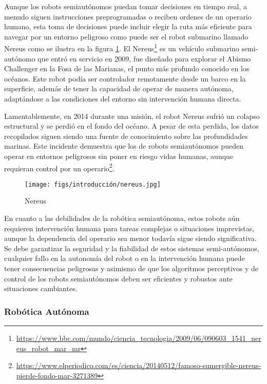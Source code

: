 Aunque los robots semiautónomos puedan tomar decisiones en tiempo real, a menudo siguen instrucciones preprogramadas o reciben ordenes de un operario humano, esta toma de decisiones
puede incluir elegir la ruta más eficiente para navegar por un entorno peligroso como puede ser el robot submarino llamado Nereus como se ilustra en la figura \ref{fig:Nereus}. 
El Nereus\footnote{\url{https://www.bbc.com/mundo/ciencia_tecnologia/2009/06/090603_1541_nereus_robot_mar_mr}} 
es un vehículo submarino semi-autónomo que entró en servicio en 2009, fue diseñado para explorar el Abismo Challenger en la Fosa de las Marianas, el punto más profundo conocido en los 
océanos. Este robot podía ser controlador remotamente desde un barco en la superficie, además de tener la capacidad de operar de manera autónoma, adaptándose a las condiciones del entorno
sin intervención humana directa.

Lamentablemente, en 2014 durante una misión, el robot Nereus sufrió un colapso estructural y se perdió en el fondo del océano. A pesar de esta perdida, los datos recopilados
siguen siendo una fuente de conocimiento sobre las profundidades marinas. Este incidente demuestra que los de robots semiautónomos pueden operar en entornos peligrosos sin poner 
en riesgo vidas humanas, aunque requieran control por un operario\footnote{\url{https://www.elperiodico.com/es/ciencia/20140512/famoso-sumergible-nereus-pierde-fondo-mar-3271389}}. 

\begin{figure} [H]
  \begin{center}
    \texttt{[image: figs/introducción/nereus.jpg]}
  \end{center}
  \caption{Nereus}
  \label{fig:Nereus}
  \vspace{-1.5em}
\end{figure}

En cuanto a las debilidades de la robótica semiautónoma, estos robots 
aún requieren intervención humana para tareas complejas o situaciones imprevistas, aunque la dependencia del operario sea menor todavía sigue siendo significativa. 
Se debe garantizar la seguridad y la fiabilidad de estos sistemas semi-autónomos, cualquier fallo en la autonomía del robot 
o en la intervención humana puede tener consecuencias peligrosas y asimismo de que los algoritmos perceptivos y de control de los robots semiautónomos deben ser eficientes y 
robustos ante situaciones cambiantes.

\subsubsection{Robótica Autónoma}
\label{sec:subseccion}

